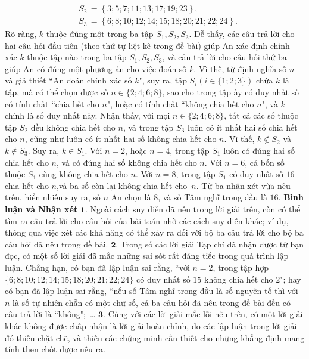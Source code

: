 \begin{multicols}{2}
\begin{align*}
		&{S_2}\, = \left\{ {3;5;7;11;13;17;19;23} \right\},\\
		&{S_3}\, = \left\{ {6;8;10;12;14;15;18;20;21;22;24} \right\}.
	\end{align*}
	Rõ ràng, $k$ thuộc đúng một trong ba tập  $S_1, S_2, S_3$.
	\vskip 0.05cm
	Dễ thấy, các câu trả lời cho hai câu hỏi đầu tiên (theo thứ tự liệt kê trong đề bài) giúp An xác định chính xác $k$ thuộc tập nào trong ba tập  $S_1, S_2, S_3$, và câu trả lời cho câu hỏi thứ ba giúp An có đúng một phương án cho việc đoán số $k$.
	\vskip 0.05cm
	Vì thế, từ định nghĩa số $n$ và giả thiết ``An đoán chính xác số $k$", suy ra, tập  \linebreak$S_i (i \in \{1; 2; 3\})$ chứa $k$ là tập, mà có thể chọn được số $n \in \{2; 4; 6; 8\}$, sao cho trong tập ấy có duy nhất số có tính chất ``chia hết cho $n$", hoặc có tính chất ``không chia hết cho $n$", và $k$ chính là số duy nhất này.
	\vskip 0.05cm
	Nhận thấy, với mọi $n \in \{2; 4; 6; 8\}$, tất cả các số thuộc tập $S_2$  đều không chia hết cho $n$, và trong tập $S_3$  luôn có ít nhất hai số chia hết cho $n$, cũng như luôn có ít nhất hai số không chia hết cho $n$. Vì thế, $k \notin S_2$  và  $k \notin S_3$. Suy ra, $k \in S_1$.
	\vskip 0.05cm 
	Với $n= 2$, hoặc $n= 4$, trong tập  $S_1$ luôn có đúng hai số chia hết cho $n$, và có đúng hai số không chia hết cho $n$.
	\vskip 0.05cm
	Với $n= 6$, cả bốn số thuộc  $S_1$ cùng không chia hết cho $n$.
	\vskip 0.05cm
	Với $n= 8$, trong tập $S_1$  có duy nhất số $16$ chia hết cho $n$,và ba số còn lại không chia hết cho~$n$.
	\vskip 0.05cm
	Từ ba nhận xét vừa nêu trên, hiển nhiên suy ra, số $n$ An chọn là $8$, và số Tâm nghĩ trong đầu là $16$.
	\vskip 0.05cm
	\textbf{\color{thachthuctoanhoc}Bình luận và Nhận xét}
	\vskip 0.05cm
	$\pmb{1.}$ Ngoài cách suy diễn đã nêu trong lời giải trên, còn có thể tìm ra câu trả lời cho câu hỏi của bài toán nhờ các cách suy diễn khác; ví dụ, thông qua việc xét các khả năng có thể xảy ra đối với bộ ba câu trả lời cho bộ ba câu hỏi đã nêu trong đề bài.
	\vskip 0.05cm
	$\pmb{2.}$ Trong số các lời giải Tạp chí đã nhận được từ bạn đọc, có một số lời giải đã mắc những sai sót rất đáng tiếc trong quá trình lập luận. Chẳng hạn, có bạn đã lập luận sai rằng, ``với $n= 2$, trong tập hợp $\{6; 8; 10; 12; 14; 15; 18; 20; 21; 22; 24\}$ có duy nhất số $15$ không chia hết cho $2$"; hay có bạn đã lập luận sai rằng, ``nếu số Tâm nghĩ trong đầu là số nguyên tố thì với $n$ là số tự nhiên chẵn có một chữ số, cả ba câu hỏi đã nêu trong đề bài đều có câu trả lời là ``không";~\ldots 
	\vskip 0.05cm
	$\pmb{3.}$ Cùng với các lời giải mắc lỗi nêu trên, có một lời giải khác không được chấp nhận là lời giải hoàn chỉnh, do các lập luận trong lời giải đó thiếu chặt chẽ, và thiếu các chứng minh cần thiết cho những khẳng định mang tính then chốt được nêu ra.

\end{multicols}
